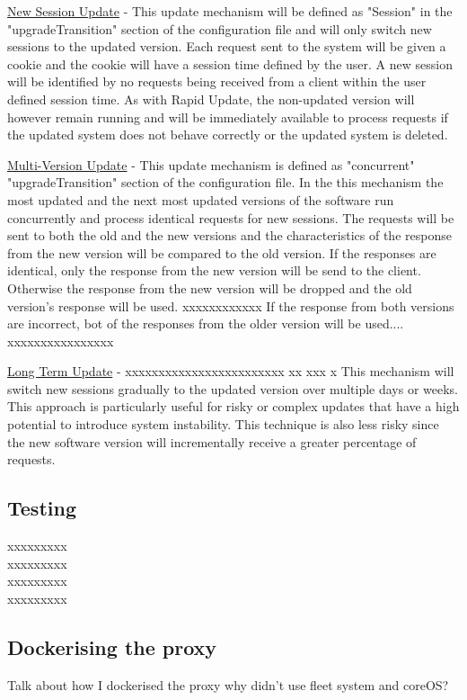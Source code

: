 \documentclass[a4paper,11pt,twoside]{article}
\begin{document}
\underline{New Session Update} - This update mechanism will be defined as "Session" in the "upgradeTransition" section of the configuration file and will only switch new sessions to the updated version. Each request sent to the system will be given a cookie and the cookie will have a session time defined by the user. A new session will be identified by no requests being received from a client within the user defined session time.  As with Rapid Update, the non-updated version will however remain running and will be immediately available to process requests if the updated system does not behave correctly or the updated system is deleted.

\underline{Multi-Version Update} - This update mechanism is defined as "concurrent"  "upgradeTransition" section of the configuration file. In the  this mechanism the most updated and the next most updated versions of the software run concurrently and  process identical requests for new sessions. The requests will be sent to both the old and the new versions and the characteristics of the response from the new version will be compared to the old version. If the responses are identical, only the response from the new version will be send to the client. Otherwise the response from the new version will be dropped and the old version's response will be used. xxxxxxxxxxxx If the response from both versions are incorrect, bot of the responses from the older version will be used.... xxxxxxxxxxxxxxxx  


\underline{Long Term Update} - xxxxxxxxxxxxxxxxxxxxxxxx xx    xxx  x This mechanism will switch new sessions gradually to the updated version over multiple days or weeks. This approach is particularly useful for risky or complex updates that have a high potential to introduce system instability. This technique is also less risky since the new software version will incrementally receive a greater percentage of requests.



\subsection{Testing}
xxxxxxxxx\\
xxxxxxxxx\\
xxxxxxxxx\\
xxxxxxxxx\\

\subsection{Dockerising the proxy}
Talk about how I dockerised the proxy
why didn't use fleet system and coreOS? 
\end{document}
